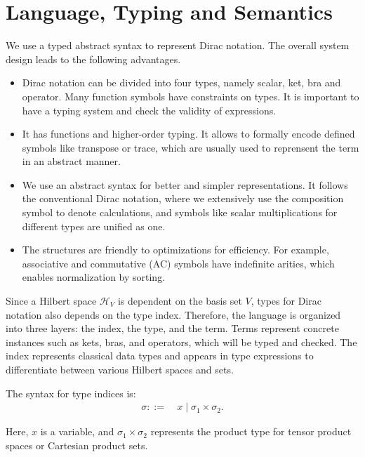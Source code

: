 
\section{Language, Typing and Semantics}
We use a typed abstract syntax to represent Dirac notation. The overall system design leads to the following advantages. 
\begin{itemize}
    \item Dirac notation can be divided into four types, namely scalar, ket, bra and operator. Many function symbols have constraints on types. It is important to have a typing system and check the validity of expressions. 
    \item It has functions and higher-order typing. It allows to formally encode defined symbols like transpose or trace, which are usually used to reprensent the term in an abstract manner. 
    \item We use an abstract syntax for better and simpler representations. It follows the conventional Dirac notation, where we extensively use the composition symbol to denote calculations, and symbols like scalar multiplications for different types are unified as one.
    \item The structures are friendly to optimizations for efficiency. For example, associative and commutative (AC) symbols have indefinite arities, which enables normalization by sorting.
\end{itemize}

Since a Hilbert space $\mathcal{H}_V$ is dependent on the basis set $V$,
types for Dirac notation also depends on the type index.
Therefore, the language is organized into three layers: the index, the type, and the term. 
Terms represent concrete instances such as kets, bras, and operators, which will be typed and checked. The index represents classical data types and appears in type expressions to differentiate between various Hilbert spaces and sets.

\begin{definition}
    The syntax for type indices is:
    \begin{align*}
        \sigma ::=\ & x \mid \sigma_1 \times \sigma_2.
    \end{align*}
\end{definition}
Here, \( x \) is a variable, and \( \sigma_1 \times \sigma_2 \) represents the product type for tensor product spaces or Cartesian product sets.

